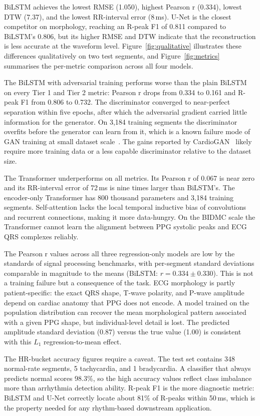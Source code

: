 \documentclass[11pt,a4paper]{article}
\begin{document}
BiLSTM achieves the lowest RMSE (1.050), highest Pearson r (0.334), lowest DTW (7.37), and the lowest RR-interval error (8\,ms). U-Net is the closest competitor on morphology, reaching an R-peak F1 of 0.811 compared to BiLSTM's 0.806, but its higher RMSE and DTW indicate that the reconstruction is less accurate at the waveform level. Figure~\ref{fig:qualitative} illustrates these differences qualitatively on two test segments, and Figure~\ref{fig:metrics} summarises the per-metric comparison across all four models.

The BiLSTM with adversarial training performs worse than the plain BiLSTM on every Tier 1 and Tier 2 metric: Pearson r drops from 0.334 to 0.161 and R-peak F1 from 0.806 to 0.732. The discriminator converged to near-perfect separation within five epochs, after which the adversarial gradient carried little information for the generator. On 3,184 training segments the discriminator overfits before the generator can learn from it, which is a known failure mode of GAN training at small dataset scale~\cite{isola2017pix2pix}. The gains reported by CardioGAN~\cite{sarkar2021cardiogan} likely require more training data or a less capable discriminator relative to the dataset size.

The Transformer underperforms on all metrics. Its Pearson r of 0.067 is near zero and its RR-interval error of 72\,ms is nine times larger than BiLSTM's. The encoder-only Transformer has 800 thousand parameters and 3,184 training segments. Self-attention lacks the local temporal inductive bias of convolutions and recurrent connections, making it more data-hungry. On the BIDMC scale the Transformer cannot learn the alignment between PPG systolic peaks and ECG QRS complexes reliably.

The Pearson r values across all three regression-only models are low by the standards of signal processing benchmarks, with per-segment standard deviations comparable in magnitude to the means (BiLSTM: $r=0.334 \pm 0.330$). This is not a training failure but a consequence of the task. ECG morphology is partly patient-specific: the exact QRS shape, T-wave polarity, and P-wave amplitude depend on cardiac anatomy that PPG does not encode. A model trained on the population distribution can recover the mean morphological pattern associated with a given PPG shape, but individual-level detail is lost. The predicted amplitude standard deviation (0.87) versus the true value (1.00) is consistent with this $L_1$ regression-to-mean effect.

The HR-bucket accuracy figures require a caveat. The test set contains 348 normal-rate segments, 5 tachycardia, and 1 bradycardia. A classifier that always predicts normal scores 98.3\%, so the high accuracy values reflect class imbalance more than arrhythmia detection ability. R-peak F1 is the more diagnostic metric: BiLSTM and U-Net correctly locate about 81\% of R-peaks within 50\,ms, which is the property needed for any rhythm-based downstream application.
\end{document}
